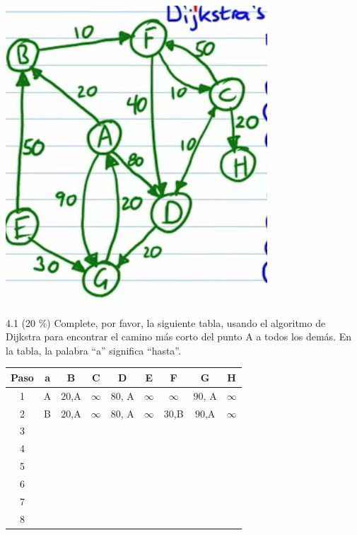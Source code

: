 \documentclass[twocolumn]{article}
\begin{document}
\begin{center}
\includegraphics[scale=0.3]{dij.png}
\end{center}

4.1 (20 \%) Complete, por favor, la siguiente tabla, usando
el algoritmo de Dijkstra para encontrar el camino más corto
del punto A a todos los demás. En la tabla, la palabra ``a'' significa ``hasta''.

{\footnotesize
\begin{center}
\begin{tabular}{| c | c | c | c | c | c | c | c | c |}
\hline
Paso  & a & B & C & D & E & F & G & H \\
\hline
1 &  A  & $20$,A  & $\infty$  & $80$, A  & $\infty$   & $\infty$  & $90$, A  & $\infty$  \\
\hline
2 &  B  & $20$,A  &  $\infty$  & $80$, A  & $\infty$  & $30$,B  & $90$,A   & $\infty$  \\
\hline
3 &   &   &   &   &   &   &   &   \\
\hline
4 &   &   &   &   &   &   &   &   \\
\hline
5 &   &   &   &   &   &   &   &   \\
\hline
6 &   &   &   &   &   &   &   &   \\
\hline
7 &   &   &   &   &   &   &   &   \\ 
\hline
8 &   &   &   &   &   &   &   &   \\ 
\hline
\end{tabular}
\end{center}
}
\end{document}
